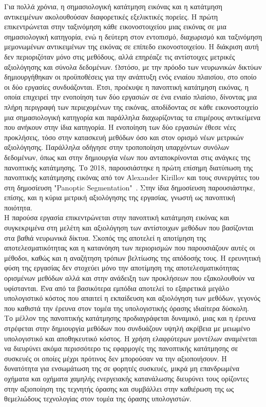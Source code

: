 \documentclass[12pt]{article}
\numberwithin{equation}{section}
\begin{document}
Για πολλά χρόνια, η σημασιολογική κατάτμηση εικόνας και η κατάτμηση αντικειμένων ακολουθούσαν διαφορετικές εξελικτικές πορείες. Η πρώτη επικεντρώνεται στην ταξινόμηση κάθε εικονοστοιχείου μιας εικόνας σε μια σημασιολογική κατηγορία, ενώ η δεύτερη στον εντοπισμό, διαχωρισμό και ταξινόμηση μεμονωμένων αντικειμένων της εικόνας σε επίπεδο εικονοστοιχείου. Η διάκριση αυτή δεν περιοριζόταν μόνο στις μεθόδους, αλλά επηρέαζε τις αντίστοιχες μετρικές αξιολόγησης και σύνολα δεδομένων. Ωστόσο, με την πρόοδο των νευρωνικών δικτύων δημιουργήθηκαν οι προϋποθέσεις για την ανάπτυξη ενός ενιαίου πλαισίου, στο οποίο οι δύο εργασίες συνδυάζονται. Έτσι, προέκυψε η πανοπτική κατάτμηση εικόνας, η οποία επιχειρεί την ενοποίηση των δύο εργασιών σε ένα ενιαίο πλαίσιο, δίνοντας μια πλήρη περιγραφή των περιεχομένων της εικόνας, αποδίδοντας σε κάθε εικονοστοιχείο μια σημασιολογική κατηγορία και παράλληλα διαχωρίζοντας τα επιμέρους αντικείμενα που ανήκουν στην ίδια κατηγορία. Η ενοποίηση των δύο εργασιών έθεσε νέες  προκλήσεις, τόσο στην κατασκευή μεθόδων όσο και στον ορισμό νέων μετρικών αξιολόγησης. Παράλληλα οδήγησε στην τροποποίηση υπαρχόντων συνόλων δεδομένων, όπως και στην δημιουργία νέων που ανταποκρίνονται στις ανάγκες της πανοπτικής κατάτμησης. Το 2018, παρουσιάστηκε η πρώτη επίσημη διατύπωση της πανοπτικής κατάτμησης εικόνας από τον Alexander Kirillov και τους συνεργάτες του στη δημοσίευση "Panoptic Segmentation"~\cite{Kirillov_2019_CVPR}. Στην ίδια δημοσίευση παρουσιάστηκε, επίσης, και η κύρια μετρική αξιολόγησης της εργασίας, γνωστή ως πανοπτική ποιότητα.\\

Η παρούσα εργασία επικεντρώνεται στην πανοπτική κατάτμηση εικόνας και συγκεκριμένα στη μελέτη και αξιολόγηση των αντίστοιχων μεθόδων που βασίζονται στα βαθιά νευρωνικά δίκτυα. Σκοπός της αποτελεί η αποτίμηση της αποτελεσματικότητας και η κατανόηση των περιορισμών που παρουσιάζουν αυτές οι μέθοδοι, καθώς και η αναζήτηση τρόπων βελτίωσης της απόδοσής τους. Η ερευνητική φύση της εργασίας δεν στοχεύει μόνο την αποτίμηση της αποτελεσματικότητας ορισμένων μεθόδων αλλά και στην ανάδειξη των προκλήσεων που εξακολουθούν να υφίστανται. Ένα από τα βασικότερα εμπόδια αποτελεί το εξαιρετικά μεγάλο υπολογιστικό κόστος που απαιτεί η εκπαίδευση και αξιολόγηση των μεθόδων, γεγονός που καθιστά  την έρευνα στον τομέα της υπολογιστικής όρασης ιδιαίτερα δύσκολη. \\

Το μέλλον της πανοπτικής κατάτμησης προδιαγράφεται δυναμικό, μιας και η έρευνα στρέφεται στην δημιουργία μεθόδων που συνδυάζουν υψηλή ακρίβεια με μειωμένο υπολογιστικό και αποθηκευτικό κόστος. Η χρήση ελαφρύτερων μοντέλων αναμένεται να διευρύνει ακόμα περισσότερο τις εφαρμογές της πανοπτικής κατάτμησης σε συσκευές οι οποίες μέχρι πρότινος δεν μπορούσαν να την αξιοποιήσουν. Η δυνατότητα για ενσωμάτωση της σε φορητές συσκευές, μικρά μη επανδρωμένα οχήματα και οχήματα χαμηλής ενεργειακής κατανάλωσης διευρύνει τους ορίζοντες στην αξιοποίηση της τεχνητής όρασης και συμβάλλει στην καθιέρωση της ως θεμελιώδους τεχνολογίας στον τομέα της όρασης υπολογιστών.\\
\end{document}
